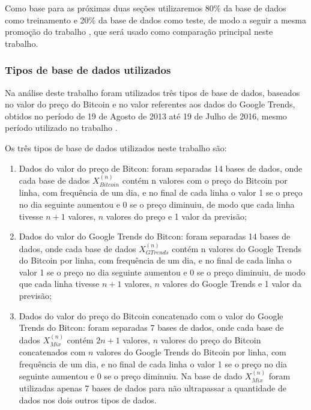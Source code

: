 Como base para as próximas duas seções utilizaremos 80\% da base de dados como treinamento e 20\% da base de dados como teste, de modo a seguir a mesma promoção do trabalho \cite{mcnally2016predicting}, que será usado como comparação principal neste trabalho.

\subsubsection{Tipos de base de dados utilizados}

Na análise deste trabalho foram utilizados três tipos de base de dados, baseados no valor do preço do Bitcoin e no valor referentes aos dados do Google Trends, obtidos no período de 19 de Agosto de 2013 até 19 de Julho de 2016, mesmo período utilizado no trabalho \cite{mcnally2016predicting}.

Os três tipos de base de dados utilizados neste trabalho são:
\begin{enumerate}

    \item Dados do valor do preço de Bitcon: foram separadas 14 bases de dados, onde cada base de dados $X_{Bitcoin}^{(n)}$ contém n valores com o preço do Bitcoin por linha, com frequência de um dia, e no final de cada linha o valor 1 se o preço no dia seguinte aumentou e 0 se o preço diminuiu, de modo que cada linha tivesse $n+1$ valores, $n$ valores do preço e 1 valor da previsão;
    
    \item Dados do valor do Google Trends do Bitcon: foram separadas 14 bases de dados, onde cada base de dados $X_{GTrends}^{(n)}$ contém n valores do Google Trends do Bitcoin por linha, com frequência de um dia, e no final de cada linha o valor 1 se o preço no dia seguinte aumentou e 0 se o preço diminuiu, de modo que cada linha tivesse $n+1$ valores, $n$ valores do Google Trends e 1 valor da previsão;
    
    \item Dados do valor do preço do Bitcoin concatenado com o valor do Google Trends do Bitcon: foram separadas 7 bases de dados, onde cada base de dados $X_{Mix}^{(n)}$ contém $2n+1$ valores, $n$ valores do preço do Bitcoin concatenados com $n$ valores do Google Trends do Bitcoin por linha, com frequência de um dia, e no final de cada linha o valor 1 se o preço no dia seguinte aumentou e 0 se o preço diminuiu. Na base de dado $X_{Mix}^{(n)}$ foram utilizadas apenas 7 bases de dados para não ultrapassar a quantidade de dados nos dois outros tipos de dados.
    
\end{enumerate}

